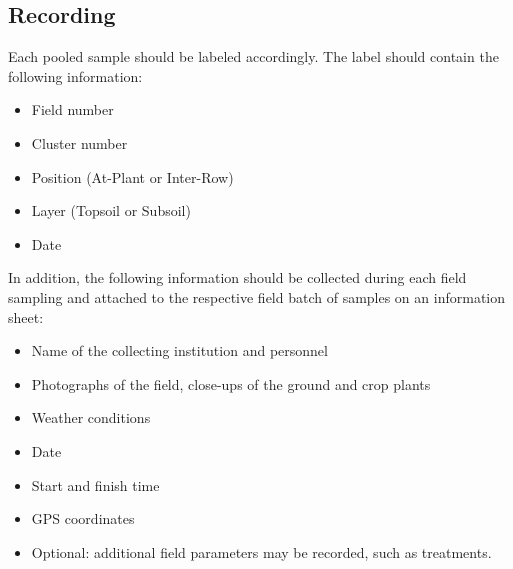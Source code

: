 \begin{refsection}
\subsection*{Recording}

Each pooled sample should be labeled accordingly. The label should contain the following information:

\begin{itemize}
\item Field number
\item Cluster number
\item Position (At-Plant or Inter-Row)
\item Layer (Topsoil or Subsoil)
\item Date
\end{itemize}

In addition, the following information should be collected during each field sampling and attached to the respective field batch of samples on an information sheet:
\begin{itemize}
\item Name of the collecting institution and personnel
\item Photographs of the field, close-ups of the ground and crop plants
\item Weather conditions
\item Date
\item Start and finish time
\item GPS coordinates
\item Optional: additional field parameters may be recorded, such as treatments.
\end{itemize}

\clearpage
\end{refsection} %
